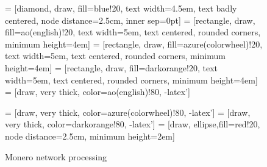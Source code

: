 \documentclass[
  printed, %
  table,   %
  nolof,     %
  nolot,     %
           oneside, color
]{fithesis3}
\begin{document}
\begin{figure}[H]
\center
{} = [diamond, draw, fill=blue!20,
    text width=4.5em, text badly centered, node distance=2.5cm, inner sep=0pt]
 = [rectangle, draw, fill=ao(english)!20,
    text width=5em, text centered, rounded corners, minimum height=4em]
 = [rectangle, draw, fill=azure(colorwheel)!20,
    text width=5em, text centered, rounded corners, minimum height=4em]
 = [rectangle, draw, fill=darkorange!20,
    text width=5em, text centered, rounded corners, minimum height=4em]
 = [draw, very thick, color=ao(english)!80, -latex']

 = [draw, very thick, color=azure(colorwheel)!80, -latex']
 = [draw, very thick, color=darkorange!80, -latex']
 = [draw, ellipse,fill=red!20, node distance=2.5cm,
    minimum height=2em]

\caption{Monero network processing}
\label{pict:network-processing}
\end{figure}
\end{document}
